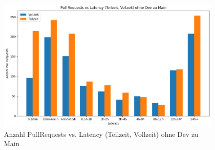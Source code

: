\begin{figure}[htbp]
    \includegraphics[width=\textwidth]{Figures/anz-prs-vs-latency-tv-no-dev.png}
    \caption{Anzahl PullRequests vs. Latency (Teilzeit, Vollzeit) ohne Dev zu Main}
    \label{fig:anz-prs-vs-latency-tv-no-dev}
\end{figure}

\newpage
